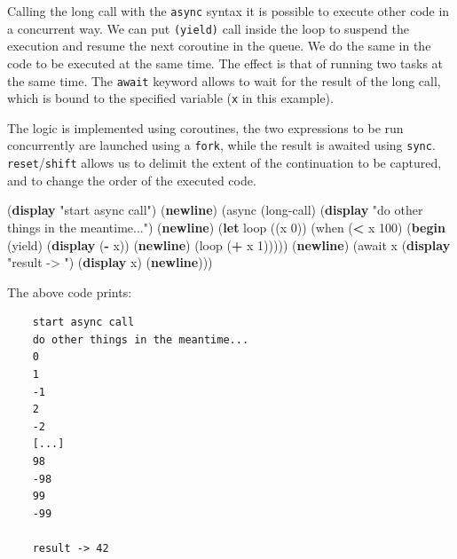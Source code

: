 \documentclass[12pt,a4paper,oneside,openright]{book}
\newenvironment{Shaded}{\begin{snugshade}}{\end{snugshade}}
\newcommand{\KeywordTok}[1]{\textcolor[rgb]{0.13,0.29,0.53}{\textbf{{#1}}}}
\newcommand{\DecValTok}[1]{\textcolor[rgb]{0.00,0.00,0.81}{{#1}}}
\newcommand{\StringTok}[1]{\textcolor[rgb]{0.31,0.60,0.02}{{#1}}}
\newcommand{\NormalTok}[1]{{#1}}
\begin{document}
Calling the long call with the \texttt{async} syntax it is possible to
execute other code in a concurrent way. We can put \texttt{(yield)} call
inside the loop to suspend the execution and resume the next coroutine
in the queue. We do the same in the code to be executed at the same
time. The effect is that of running two tasks at the same time. The
\texttt{await} keyword allows to wait for the result of the long call,
which is bound to the specified variable (\texttt{x} in this example).

The logic is implemented using coroutines, the two expressions to be run
concurrently are launched using a \texttt{fork}, while the result is
awaited using \texttt{sync}. \texttt{reset}/\texttt{shift} allows us to
delimit the extent of the continuation to be captured, and to change the
order of the executed code.

\begin{Shaded}
\begin{Highlighting}[]
    \NormalTok{(}\KeywordTok{display} \StringTok{"start async call"}\NormalTok{)}
    \NormalTok{(}\KeywordTok{newline}\NormalTok{)}
    \NormalTok{(async (long-call)}
           \NormalTok{(}\KeywordTok{display} \StringTok{"do other things in the meantime..."}\NormalTok{)}
           \NormalTok{(}\KeywordTok{newline}\NormalTok{)}
           \NormalTok{(}\KeywordTok{let} \NormalTok{loop ((x }\DecValTok{0}\NormalTok{))}
             \NormalTok{(when (}\KeywordTok{<} \NormalTok{x }\DecValTok{100}\NormalTok{)}
               \NormalTok{(}\KeywordTok{begin} \NormalTok{(yield)}
                      \NormalTok{(}\KeywordTok{display} \NormalTok{(}\KeywordTok{-} \NormalTok{x))}
                      \NormalTok{(}\KeywordTok{newline}\NormalTok{)}
                      \NormalTok{(loop (}\KeywordTok{+} \NormalTok{x }\DecValTok{1}\NormalTok{)))))}
           \NormalTok{(}\KeywordTok{newline}\NormalTok{)}
      \NormalTok{(await x}
        \NormalTok{(}\KeywordTok{display} \StringTok{"result -> "}\NormalTok{)}
        \NormalTok{(}\KeywordTok{display} \NormalTok{x)}
        \NormalTok{(}\KeywordTok{newline}\NormalTok{)))}
\end{Highlighting}
\end{Shaded}

The above code prints:

\begin{verbatim}
    start async call
    do other things in the meantime...
    0
    1
    -1
    2
    -2
    [...]
    98
    -98
    99
    -99

    result -> 42
\end{verbatim}
\end{document}
